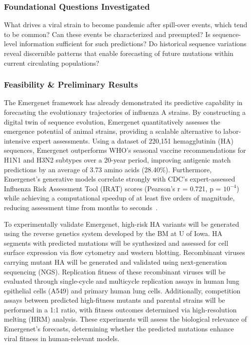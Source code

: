\documentclass[onecolumn, compsoc,11pt]{IEEEtran}
\begin{document}
\subsubsection*{Foundational Questions Investigated} What drives a viral strain to become pandemic after spill-over events, which tend to be common? Can these events be characterized and preempted? Is sequence-level information sufficient for such predictions? Do historical sequence variations reveal discernible patterns that enable forecasting of future mutations within current circulating populations?

\subsubsection*{Feasibility \& Preliminary Results}
The Emergenet framework has already demonstrated its predictive capability in forecasting the evolutionary trajectories of influenza A strains. By constructing a digital twin of sequence evolution, Emergenet quantitatively assesses the emergence potential of animal strains, providing a scalable alternative to labor-intensive expert assessments. Using a dataset of 220,151 hemagglutinin (HA) sequences, Emergenet outperforms WHO’s seasonal vaccine recommendations for H1N1 and H3N2 subtypes over a 20-year period, improving antigenic match predictions by an average of 3.73 amino acids (28.40\%). Furthermore, Emergenet’s generative models correlate strongly with CDC’s expert-assessed Influenza Risk Assessment Tool (IRAT) scores (Pearson’s r = 0.721, p = $10^{-4}$) while achieving a computational speedup of at least five orders of magnitude, reducing assessment time from months to seconds~\cite{wu2024emergenet}.

To experimentally validate Emergenet, high-risk HA variants will be generated using the reverse genetics system developed by the BM at U of Iowa. HA segments with predicted mutations will be synthesized and assessed for cell surface expression via flow cytometry and western blotting. Recombinant viruses carrying mutant HA will be generated and validated using next-generation sequencing (NGS). Replication fitness of these recombinant viruses will be evaluated through single-cycle and multicycle replication assays in human lung epithelial cells (A549) and primary human lung cells. Additionally, competition assays between predicted high-fitness mutants and parental strains will be performed in a 1:1 ratio, with fitness outcomes determined via high-resolution melting (HRM) analysis. These experiments will assess the biological relevance of Emergenet’s forecasts, determining whether the predicted mutations enhance viral fitness in human-relevant models.
\end{document}
